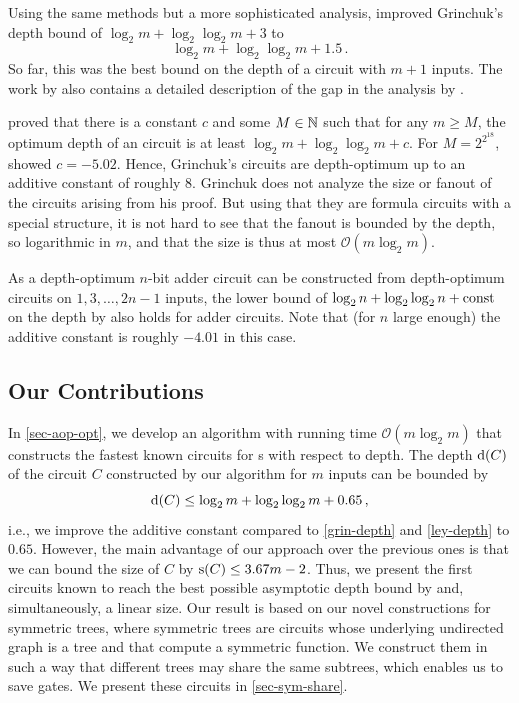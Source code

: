 Using the same methods but a more sophisticated analysis,
\citet{Ley2022} improved Grinchuk's depth bound of
$\log_2 m + \log_2 \log_2 m + 3$ to  
\begin{equation}\label{ley-depth}
\log_2 m + \log_2 \log_2 m + 1.5\,. 
\end{equation}
So far, this was the best bound on the depth of a \aop{} circuit with
$m+1$ inputs. The work by \citet{Ley2022} also contains a detailed
description of the gap in the analysis by \cite{Grinchuk}.

\citet{Commentz-Walter-mon} proved that there is a constant $c$
and some $M \in \mathbb N$ such that for any $m \geq M$,
the optimum depth of an \aop{} circuit
is at least
$\log_2 m + \log_2 \log_2 m + c$.
For $M = 2^{2^{18}}$, \citet{Hitzschke2018} showed $c = -5.02$.
Hence, Grinchuk's circuits are depth-optimum up to an additive
constant of roughly $8$.
Grinchuk does not analyze the size or fanout of the circuits arising from his proof.
But using that they are formula circuits
with a special structure, it is not hard to see
that the fanout is bounded by the depth, so logarithmic in $m$,
and that the size is thus at most $\mathcal O(m \log_2 m)$.

\begin{sloppypar}
As a depth-optimum $n$-bit adder circuit can be constructed from
depth-optimum \aop{} circuits on $1, 3, \dotsc, 2n - 1$ inputs,
the lower bound of $\log_2 n + \log_2 \log_2  n + \text{const}$ on the depth
by \citet{Commentz-Walter-mon} also holds for adder circuits.
Note that (for $n$ large enough) the additive constant is roughly 
$-4.01$ in this case.
\end{sloppypar}

\subsection{Our Contributions}

In \cref{sec-aop-opt},
we develop an algorithm
with running time $\mathcal O(m \log_2 m)$
that constructs the fastest known circuits for \aop{}s
with respect to depth.
The depth $\operatorname{d}(C)$ of the \aop{} circuit $C$ constructed by our algorithm
for $m$ inputs can be bounded by
\begin{equation} \label{our-aop-depth}
\operatorname{d}(C) \leq \log_2 m + \log_2 \log_2 m + 0.65\,,
\end{equation}
i.e., we improve the additive constant compared to \cref{grin-depth}
and  \cref{ley-depth} to $0.65$.
However, the main advantage of our approach over the previous ones
is that we can bound the size of $C$ by $\operatorname{s}(C) \leq 3.67 m - 2$.
Thus, we present the first \aop{} circuits known to
reach the best possible
asymptotic depth bound by \citet{Commentz-Walter-mon}
and, simultaneously, a linear size.
Our result is based on our novel constructions for symmetric trees,
where symmetric trees are circuits whose underlying undirected graph 
is a tree and that compute a symmetric function. We construct them in 
such a way that different trees may share the same subtrees, which
enables us to save gates. We present these circuits 
in \cref{sec-sym-share}.

